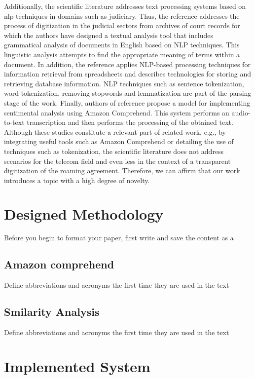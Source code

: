 \documentclass[conference]{style/IEEEtran}
\begin{document}
Additionally, the scientific literature addresses text processing systems based on nlp techniques in domains such as judiciary. Thus, the reference \cite{b9} addresses the process of digitization in the judicial sectors from archives of court records for which the authors have designed a textual analysis tool that includes grammatical analysis of documents in English based on NLP techniques. This linguistic analysis attempts to find the appropriate meaning of terms within a document. In addition, the reference \cite{b8} applies NLP-based processing techniques for information retrieval from spreadsheets and describes technologies for storing and retrieving database information. NLP techniques such as sentence tokenization, word tokenization, removing stopwords and lemmatization are part of the parsing stage of the work. Finally, authors of reference \cite{b10} propose a model for implementing sentimental analysis using Amazon Comprehend. This system performs an audio-to-text transcription and then performs the processing of the obtained text. Although these studies  constitute a relevant part of related work, e.g., by integrating useful tools such as Amazon Comprehend or detailing the use of techniques such as tokenization, the scientific literature does not address scenarios for the telecom field and even less in the context of a transparent digitization of the roaming agreement. Therefore, we can affirm that our work introduces a topic with a high degree of novelty.

\section{Designed Methodology}
Before you begin to format your paper, first write and save the content as a

\subsection{Amazon comprehend}\label{AA}
Define abbreviations and acronyms the first time they are used in the text

\subsection{Smilarity Analysis}
Define abbreviations and acronyms the first time they are used in the text

\section{Implemented System}
\end{document}
